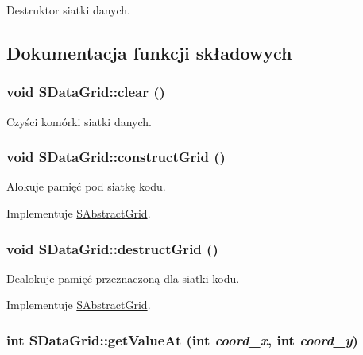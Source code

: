 Destruktor siatki danych. 

\subsection{Dokumentacja funkcji składowych}
\hypertarget{classSDataGrid_80b67d2da29f99384fb2852828d83b91}{
\subsubsection[{clear}]{\setlength{\rightskip}{0pt plus 5cm}void SDataGrid::clear ()}}
\label{classSDataGrid_80b67d2da29f99384fb2852828d83b91}


Czyści komórki siatki danych. \hypertarget{classSDataGrid_5af888335764c1ba959b6ef964223b6d}{
\subsubsection[{constructGrid}]{\setlength{\rightskip}{0pt plus 5cm}void SDataGrid::constructGrid ()}}
\label{classSDataGrid_5af888335764c1ba959b6ef964223b6d}


Alokuje pamięć pod siatkę kodu. 

Implementuje \hyperlink{classSAbstractGrid_919248aad138ffb1c969e73c3e637dcd}{SAbstractGrid}.\hypertarget{classSDataGrid_c9c0ef298fb96c56f9f9796720a41489}{
\subsubsection[{destructGrid}]{\setlength{\rightskip}{0pt plus 5cm}void SDataGrid::destructGrid ()}}
\label{classSDataGrid_c9c0ef298fb96c56f9f9796720a41489}


Dealokuje pamięć przeznaczoną dla siatki kodu. 

Implementuje \hyperlink{classSAbstractGrid_fb63d8cf5210c3606a3b7add19f06833}{SAbstractGrid}.\hypertarget{classSDataGrid_7f9dd63d74e36731875630a96ea8dd07}{
\subsubsection[{getValueAt}]{\setlength{\rightskip}{0pt plus 5cm}int SDataGrid::getValueAt (int {\em coord\_\-x}, \/  int {\em coord\_\-y})}}
\label{classSDataGrid_7f9dd63d74e36731875630a96ea8dd07}


